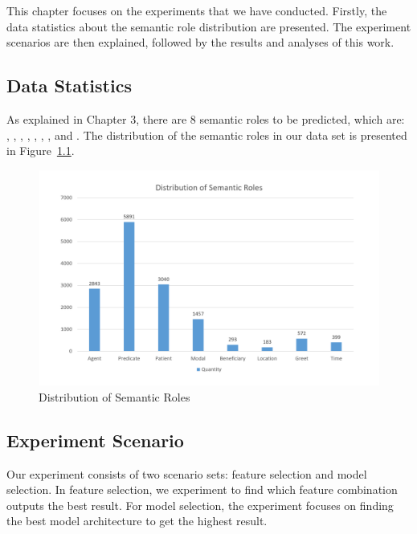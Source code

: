 \chapter{\babLima}

This chapter focuses on the experiments that we have conducted. Firstly, the data statistics about the semantic role distribution are presented. The experiment scenarios are then explained, followed by the results and analyses of this work.

\section{Data Statistics}
As explained in Chapter 3, there are 8 semantic roles to be predicted, which are: \agent, \predicate, \patient, \modal, \beneficiary, \location, \greet, and \timesrl. The distribution of the semantic roles in our data set is presented in Figure~\ref{fig:srldistribution}.

\begin{figure}
	\centering
	\includegraphics[width=\linewidth]{images/srldistribution}
	\caption{Distribution of Semantic Roles}
	\label{fig:srldistribution}
\end{figure}

\section{Experiment Scenario}
Our experiment consists of two scenario sets: feature selection and model selection. In feature selection, we experiment to find which feature combination outputs the best result. For model selection, the experiment focuses on finding the best model architecture to get the highest result.

